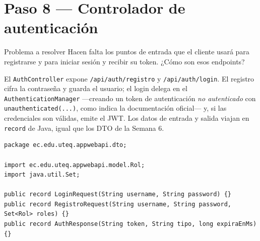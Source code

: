 \documentclass[11pt]{article}
\begin{document}
\section{Paso 8 --- Controlador de autenticación}
\begin{cajaproblema}{Problema a resolver}
Hacen falta los puntos de entrada que el cliente usará para registrarse y para iniciar sesión y recibir su token. ¿Cómo son esos endpoints?\par
\end{cajaproblema}
El \texttt{AuthController} expone \texttt{/api/auth/registro} y \texttt{/api/auth/login}. El registro cifra la contraseña y guarda el usuario; el login delega en el \texttt{AuthenticationManager} ---creando un token de autenticación \emph{no autenticado} con \texttt{unauthenticated(...)}, como indica la documentación oficial--- y, si las credenciales son válidas, emite el JWT. Los datos de entrada y salida viajan en \texttt{record} de Java, igual que los DTO de la Semana 6.

\begin{cajacodigo}
\begin{lstlisting}[style=java]
package ec.edu.uteq.appwebapi.dto;

import ec.edu.uteq.appwebapi.model.Rol;
import java.util.Set;

public record LoginRequest(String username, String password) {}
public record RegistroRequest(String username, String password, Set<Rol> roles) {}
public record AuthResponse(String token, String tipo, long expiraEnMs) {}
\end{lstlisting}
\end{cajacodigo}
\end{document}
